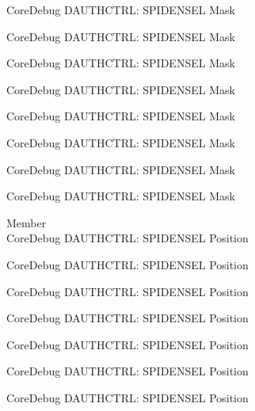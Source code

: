 \begin{DoxyRefList}
\label{deprecated__deprecated000751}%
%
Core\+Debug DAUTHCTRL\+: SPIDENSEL Mask 

\label{deprecated__deprecated000805}%
%
Core\+Debug DAUTHCTRL\+: SPIDENSEL Mask 

\label{deprecated__deprecated000881}%
%
Core\+Debug DAUTHCTRL\+: SPIDENSEL Mask 

\label{deprecated__deprecated000944}%
%
Core\+Debug DAUTHCTRL\+: SPIDENSEL Mask 

\label{deprecated__deprecated001023}%
%
Core\+Debug DAUTHCTRL\+: SPIDENSEL Mask 

\label{deprecated__deprecated001099}%
%
Core\+Debug DAUTHCTRL\+: SPIDENSEL Mask 

\label{deprecated__deprecated001202}%
%
Core\+Debug DAUTHCTRL\+: SPIDENSEL Mask 

\label{deprecated__deprecated001304}%
%
Core\+Debug DAUTHCTRL\+: SPIDENSEL Mask  
\item[Member \doxylink{group___c_m_s_i_s___s_c_b_ga587610b7ac18292de47bf9d675b0b88c}{Core\+Debug\+\_\+\+DAUTHCTRL\+\_\+\+SPIDENSEL\+\_\+\+Pos} ]\hfill \\
\label{deprecated__deprecated000091}%
%
Core\+Debug DAUTHCTRL\+: SPIDENSEL Position 

\label{deprecated__deprecated000145}%
%
Core\+Debug DAUTHCTRL\+: SPIDENSEL Position 

\label{deprecated__deprecated000221}%
%
Core\+Debug DAUTHCTRL\+: SPIDENSEL Position 

\label{deprecated__deprecated000284}%
%
Core\+Debug DAUTHCTRL\+: SPIDENSEL Position 

\label{deprecated__deprecated000363}%
%
Core\+Debug DAUTHCTRL\+: SPIDENSEL Position 

\label{deprecated__deprecated000439}%
%
Core\+Debug DAUTHCTRL\+: SPIDENSEL Position 

\label{deprecated__deprecated000542}%
%
Core\+Debug DAUTHCTRL\+: SPIDENSEL Position 


\end{DoxyRefList}
